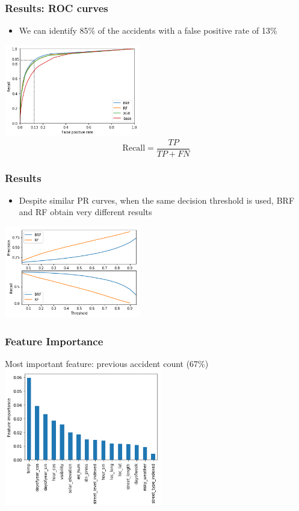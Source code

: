 \documentclass[slidestop,compress,red,mathserif]{beamer}
\begin{document}
\begin{frame}
	\frametitle{Results: ROC curves}
	\begin{itemize}
     \item We can identify 85\% of the accidents with a false positive rate of 13\%
	\end{itemize}
\centering
\includegraphics[height=4cm, keepaspectratio]{Figures/roc.png}
\begin{equation*}
  \mathrm{Recall} = \frac{TP}{TP+FN}
\end{equation*}
\end{frame}

\begin{frame}
	\frametitle{Results}
	\begin{itemize}
		\item Despite similar PR curves, when the same decision threshold is used, BRF and RF obtain very different results 
	\end{itemize}
\centering
\includegraphics[height=4cm, keepaspectratio]{Figures/pr_threshold.png}
\end{frame}

\begin{frame}
	\frametitle{Feature Importance}
\centering
\hspace*{-2cm} Most important feature: previous accident count (67\%)
\includegraphics[height=6cm, keepaspectratio]{Figures/features.png}

\end{frame}
\end{document}
